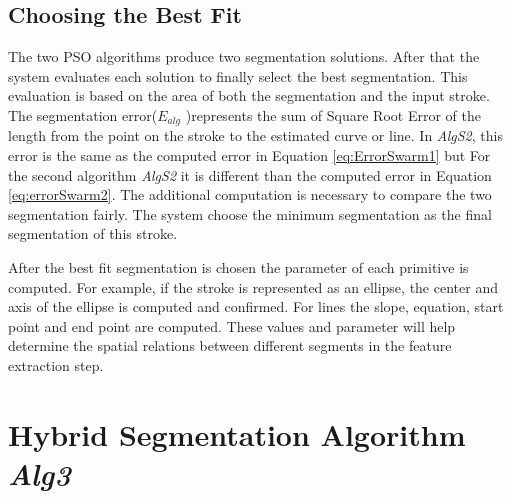 \subsection{Choosing the Best Fit}
\label{sec:bestFit}
The two PSO algorithms produce two segmentation solutions. After that the system evaluates each solution to finally select the best segmentation. This evaluation is based on the area of both the segmentation and the input stroke. The segmentation error($E_{alg}$ )represents the sum of Square Root Error of the length from the point on the stroke to the estimated curve or line. In \textsl{AlgS2}, this error is the same as the computed error in Equation \ref{eq:ErrorSwarm1} but For the second algorithm \textsl{AlgS2} it is different than the computed error in Equation \ref{eq:errorSwarm2}. The additional computation is necessary to  compare the two segmentation fairly. The system choose the minimum segmentation as the final segmentation of this stroke. 


After the best fit segmentation is chosen the parameter of each primitive is computed. For example, if the stroke is represented as an ellipse, the center and axis of the ellipse is computed and confirmed. For lines the slope, equation, start point and end point are computed.  These values and parameter will help determine the spatial relations between different segments in the feature extraction step. 
  
\section{Hybrid Segmentation Algorithm \textsl{Alg3}}
\label{sec:BenchMarckAlgorithm}

